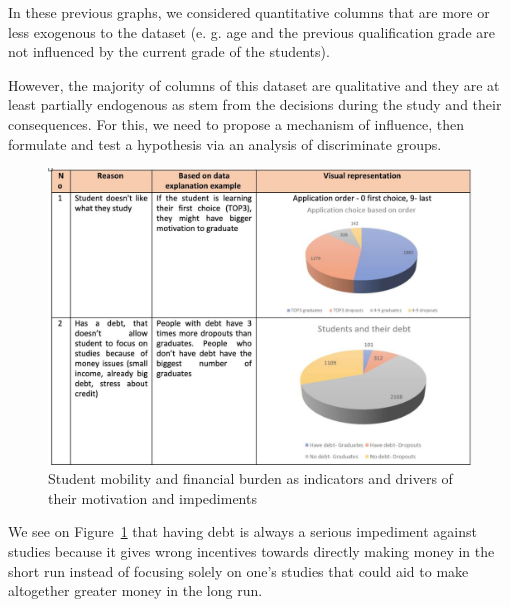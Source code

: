 \documentclass[
  letterpaper,
  DIV=11,
  numbers=noendperiod]{scrartcl}
\begin{document}
In these previous graphs, we considered quantitative columns that are
more or less exogenous to the dataset (e. g. age and the previous
qualification grade are not influenced by the current grade of the
students).

However, the majority of columns of this dataset are qualitative and
they are at least partially endogenous as stem from the decisions during
the study and their consequences. For this, we need to propose a
mechanism of influence, then formulate and test a hypothesis via an
analysis of discriminate groups.

\begin{figure}

{\centering \includegraphics{./figs/reasons-1.jpg}

}

\caption{\label{fig-word-1}Student mobility and financial burden as
indicators and drivers of their motivation and impediments}

\end{figure}

We see on Figure~\ref{fig-word-1} that having debt is always a serious
impediment against studies because it gives wrong incentives towards
directly making money in the short run instead of focusing solely on
one's studies that could aid to make altogether greater money in the
long run.
\end{document}
